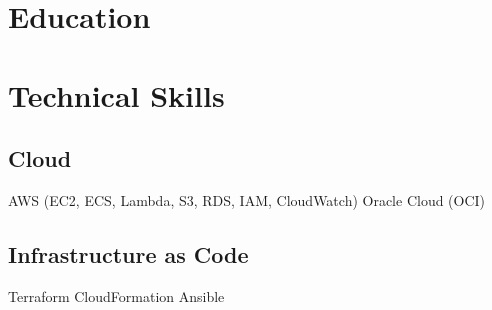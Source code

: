 \documentclass[letterpaper]{deedy-resume} %
\begin{document}

\lastupdated %



\begin{minipage}[t]{0.33\textwidth} %


\section{Education} 


\sectionspace %




\sectionspace %


\sectionspace %


\section{Technical Skills}

\subsection{Cloud}
AWS (EC2, ECS, Lambda, S3, RDS, IAM, CloudWatch) \textbullet{} Oracle Cloud (OCI)

\sectionspace

\subsection{Infrastructure as Code}
Terraform \textbullet{} CloudFormation \textbullet{} Ansible


\end{minipage}
\end{document}
